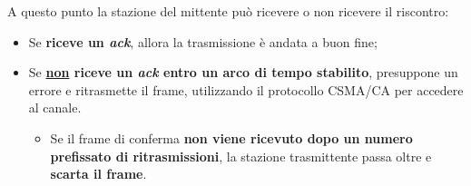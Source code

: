 \documentclass[a4paper]{article}
\begin{document}
	\noindent
	A questo punto la stazione del mittente può ricevere o non ricevere il riscontro:
	\begin{itemize}
		\item Se \textbf{riceve un \emph{ack}}, allora la trasmissione è andata a buon fine;
		\item Se \textbf{\underline{non} riceve un \emph{ack} entro un arco di tempo stabilito}, presuppone un errore e ritrasmette il frame, utilizzando il protocollo CSMA/CA per accedere al canale.
		\begin{itemize}
			\item Se il frame di conferma \textbf{non viene ricevuto dopo un numero prefissato di ritrasmissioni}, la stazione trasmittente passa oltre e \textbf{scarta il frame}.
		\end{itemize}
	\end{itemize}\newpage
	
\end{document}
